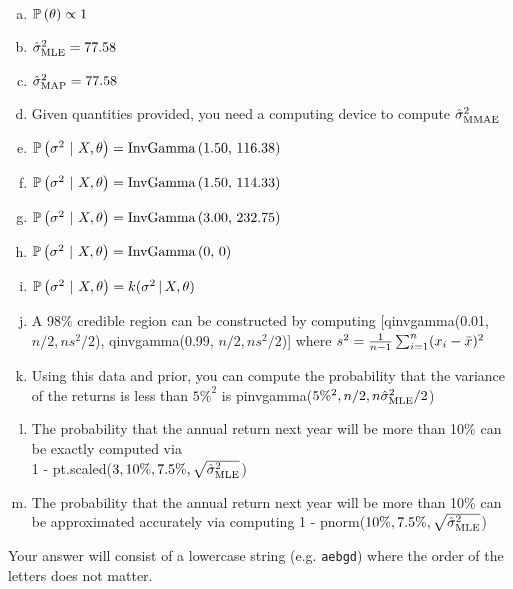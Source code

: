\documentclass[12pt,landscape]{article}
\newcommand{\instr}{\small Your answer will consist of a lowercase string (e.g. \texttt{aebgd}) where the order of the letters does not matter. \normalsize}
\begin{document}
\begin{enumerate}[(a)]
\item $\mathbb{P}\left(\theta\right) \propto 1$
\item $\hat{\sigma}^2_{\text{MLE}} = 77.58$
\item $\hat{\sigma}^2_{\text{MAP}} = 77.58$
\item Given quantities provided, you need a computing device to compute $\hat{\sigma}^2_{\text{MMAE}}$
\item $\mathbb{P}\left(\sigma^2~|~X, \theta\right) = \text{InvGamma}\left(1.50,\,116.38\right)$
\item $\mathbb{P}\left(\sigma^2~|~X, \theta\right) = \text{InvGamma}\left(1.50,\,114.33\right)$
\item $\mathbb{P}\left(\sigma^2~|~X, \theta\right) = \text{InvGamma}\left(3.00,\,232.75\right)$
\item $\mathbb{P}\left(\sigma^2~|~X, \theta\right) = \text{InvGamma}\left(0,\,0\right)$
\item $\mathbb{P}\left(\sigma^2~|~X, \theta\right) = k(\sigma^2\,|\,X,\theta)$
\item A 98\% credible region can be constructed by computing [qinvgamma(0.01, $n/2, ns^2 / 2$), qinvgamma(0.99, $n/2, ns^2 / 2$)] where $s^2 = \frac{1}{n-1}\sum_{i=1}^n (x_i - \bar{x})^2$
\item Using this data and prior, you can compute the probability that the variance of the returns is less than $5\%^2$ is pinvgamma($5\%^2, n/2, n\hat{\sigma}^2_{\text{MLE}}/2$)
\item The probability that the annual return next year will be more than 10\% can be exactly computed via \\ 1 - pt.scaled($3, 10\%, 7.5\%, \sqrt{\hat{\sigma}^2_{\text{MLE}}}$)
\item The probability that the annual return next year will be more than 10\% can be approximated accurately via computing 1 - pnorm($10\%, 7.5\%, \sqrt{\hat{\sigma}^2_{\text{MLE}}}$)
\end{enumerate}
\eenum\instr\pagebreak

\end{document}
